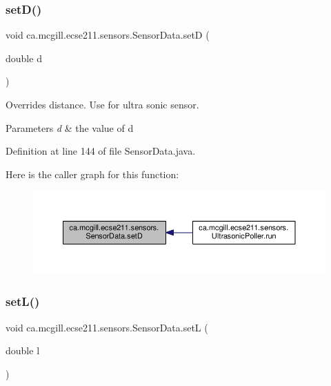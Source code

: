 \subsubsection{\texorpdfstring{set\+D()}{setD()}}
{\footnotesize\ttfamily void ca.\+mcgill.\+ecse211.\+sensors.\+Sensor\+Data.\+setD (\begin{DoxyParamCaption}\item[{double}]{d }\end{DoxyParamCaption})}

Overrides distance. Use for ultra sonic sensor.


\begin{DoxyParams}{Parameters}
{\em d} & the value of d \\
\hline
\end{DoxyParams}


Definition at line 144 of file Sensor\+Data.\+java.

Here is the caller graph for this function\+:
\nopagebreak
\begin{figure}[H]
\begin{center}
\leavevmode
\includegraphics[width=350pt]{classca_1_1mcgill_1_1ecse211_1_1sensors_1_1_sensor_data_ae20bf127c57dcfcb3b7632ca05b6d482_icgraph}
\end{center}
\end{figure}
\mbox{\label{classca_1_1mcgill_1_1ecse211_1_1sensors_1_1_sensor_data_aeafd49ce71819e8e1a5d5ff6287e7819}} 
\subsubsection{\texorpdfstring{set\+L()}{setL()}}
{\footnotesize\ttfamily void ca.\+mcgill.\+ecse211.\+sensors.\+Sensor\+Data.\+setL (\begin{DoxyParamCaption}\item[{double}]{l }\end{DoxyParamCaption})}

